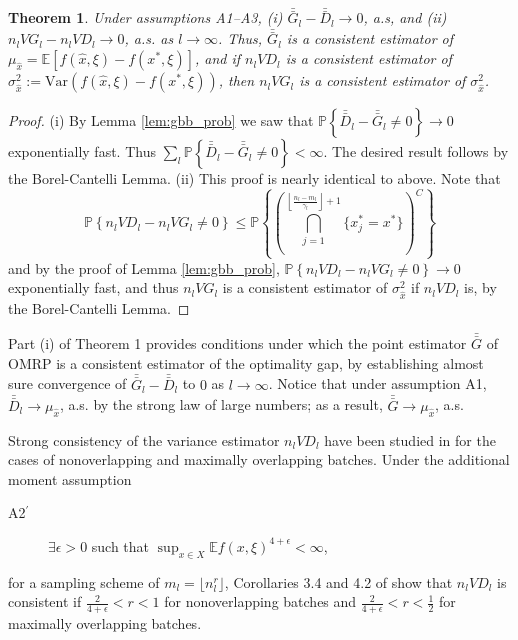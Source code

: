 \documentclass[12pt]{article}
\newtheorem{theorem}{Theorem}
\newcommand{\p}[1]{\mathbb{P} \left\{ #1 \right\}}
\newcommand{\e}[1]{\mathbb{E} %
#1 %
}
\newcommand{\var}[1]{\mathrm{Var} \left( #1 \right)}
\newcommand{\x}{x}
\newcommand{\xh}{{\hat{\x}}}
\newcommand{\xs}{\x^*}
\newcommand{\xit}{\xi}
\newcommand{\nbl}{\left\lfloor\tfrac{n_l-m_l}{\gamma_l}\right\rfloor+1}
\newcommand{\gb}{\bar{G}}
\newcommand{\gbb}{\bar{\gb}}
\newcommand{\db}{\bar{D}}
\newcommand{\dbb}{\bar{\db}}
\begin{document}
\begin{theorem} \label{thm:strong_consistency}
	Under assumptions A1--A3, (i) $\gbb_l - \dbb_l \rightarrow 0$, a.s, and (ii) $n_l VG_l - n_l VD_l \rightarrow 0$, a.s. as $l \rightarrow \infty$.  
        Thus, $\gbb_l$ is a consistent estimator of $\mu_{\xh} = \e{\left[f(\xh,\xit) - f(\xs,\xit)\right]}$, and if $n_l VD_l$ is a consistent estimator of $\sigma^2_{\xh} := \var{f(\xh,\xit) - f(\xs,\xit)}$, then $n_l VG_l$ is a consistent estimator of $\sigma^2_{\xh}$.
\end{theorem}

\begin{proof}
	(i) By Lemma \ref{lem:gbb_prob} we saw that $\p{\dbb_l - \gbb_l \neq 0} \rightarrow 0$ exponentially fast.  
        Thus $\sum_l \p{\dbb_l - \gbb_l \neq 0} < \infty$.  
        The desired result follows by the Borel-Cantelli Lemma.
%
(ii) This proof is nearly identical to above.  
Note that
	\[
		\p{n_l VD_l -n_l VG_l \neq 0} \leq \p{\left( \bigcap_{j=1}^{\nbl} \{\xs_{j} = \xs\} \right)^C}
	\]
	and by the proof of Lemma \ref{lem:gbb_prob}, $\p{n_l VD_l -n_l VG_l \neq 0} \rightarrow 0$ exponentially fast, and thus $n_l VG_l$ is a consistent estimator of $\sigma^2_{\xh}$ if $n_l VD_l$ is, by the Borel-Cantelli Lemma.
\end{proof}

Part (i) of Theorem 1 provides conditions under which the point estimator $\gbb$ of OMRP is a consistent estimator of the optimality gap, by establishing almost sure convergence of $\gbb_l - \dbb_l$ to $0$ as $l \rightarrow \infty$. 
Notice that under assumption A1, $\dbb_l \rightarrow \mu_\xh$, a.s. by the strong law of large numbers; as a result, $\gbb \rightarrow \mu_\xh$, a.s.

Strong consistency of the variance estimator $n_l VD_l$ have been studied in \citep{damerdji1994strong} for the cases of nonoverlapping and maximally overlapping batches.  
Under the additional moment assumption
\begin{description}
	\item[A2$^\prime$]  $\exists \epsilon > 0$ such that $\sup_{\x \in X} \e{f(\x,\xi)^{4+\epsilon}} < \infty$,
\end{description}
for a sampling scheme of $m_l = \lfloor n_l^r \rfloor$, Corollaries 3.4 and 4.2 of \citep{damerdji1994strong} show that $n_l VD_l$ is consistent if $\tfrac{2}{4+\epsilon} < r < 1$ for nonoverlapping batches and $\tfrac{2}{4+\epsilon} < r < \tfrac{1}{2}$ for maximally overlapping batches. 
\end{document}
